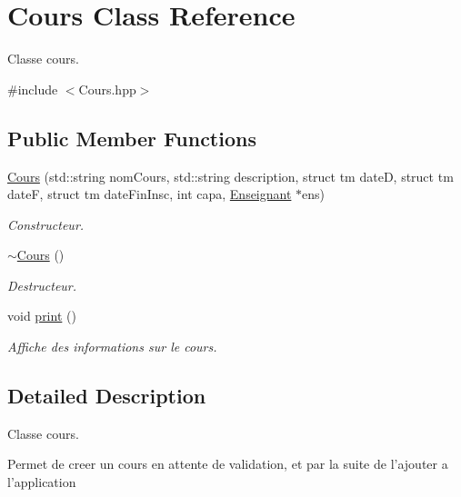 \hypertarget{classCours}{\section{Cours Class Reference}
\label{classCours}
}


Classe cours.  




{\ttfamily \#include $<$Cours.\-hpp$>$}

\subsection*{Public Member Functions}
\begin{DoxyCompactItemize}
\item 
\hyperlink{classCours_a54d01f69f01be5224bd4a76dd90dedd9}{Cours} (std\-::string nom\-Cours, std\-::string description, struct tm date\-D, struct tm date\-F, struct tm date\-Fin\-Insc, int capa, \hyperlink{classEnseignant}{Enseignant} $\ast$ens)
\begin{DoxyCompactList}\small\item\em Constructeur. \end{DoxyCompactList}\item 
\hyperlink{classCours_a598a1fa3dfe1a337fb07731a51d7da16}{$\sim$\-Cours} ()
\begin{DoxyCompactList}\small\item\em Destructeur. \end{DoxyCompactList}\item 
\hypertarget{classCours_ac0f58aede568d4a8f47f9c4a702fa297}{void \hyperlink{classCours_ac0f58aede568d4a8f47f9c4a702fa297}{print} ()}\label{classCours_ac0f58aede568d4a8f47f9c4a702fa297}

\begin{DoxyCompactList}\small\item\em Affiche des informations sur le cours. \end{DoxyCompactList}\end{DoxyCompactItemize}


\subsection{Detailed Description}
Classe cours. 

Permet de creer un cours en attente de validation, et par la suite de l'ajouter a l'application 

